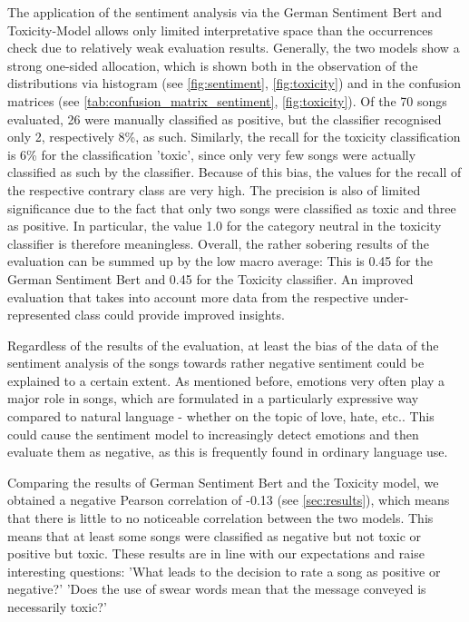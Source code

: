 The application of the sentiment analysis via the German Sentiment Bert and Toxicity-Model allows only limited interpretative space than the occurrences check due to relatively weak evaluation results. Generally, the two models show a strong one-sided allocation, which is shown both in the observation of the distributions via histogram (see \autoref{fig:sentiment}, \autoref{fig:toxicity}) and in the confusion matrices (see \autoref{tab:confusion_matrix_sentiment}, \autoref{fig:toxicity}). Of the 70 songs evaluated, 26 were manually classified as positive, but the classifier recognised only 2, respectively 8\%, as such. Similarly, the recall for the toxicity classification is 6\% for the classification 'toxic', since only very few songs were actually classified as such by the classifier. Because of this bias, the values for the recall of the respective contrary class are very high. The precision is also of limited significance due to the fact that only two songs were classified as toxic and three as positive. In particular, the value 1.0 for the category neutral in the toxicity classifier is therefore meaningless. Overall, the rather sobering results of the evaluation can be summed up by the low macro average: This is 0.45 for the German Sentiment Bert and 0.45 for the Toxicity classifier. An improved evaluation that takes into account more data from the respective under-represented class could provide improved insights.

Regardless of the results of the evaluation, at least the bias of the data of the sentiment analysis of the songs towards rather negative sentiment could be explained to a certain extent. As mentioned before, emotions very often play a major role in songs, which are formulated in a particularly expressive way compared to natural language - whether on the topic of love, hate, etc.. This could cause the sentiment model to increasingly detect emotions and then evaluate them as negative, as this is frequently found in ordinary language use.

Comparing the results of German Sentiment Bert and the Toxicity model, we obtained a negative Pearson correlation of -0.13 (see \autoref{sec:results}), which means that there is little to no noticeable correlation between the two models. This means that at least some songs were classified as negative but not toxic or positive but toxic. These results are in line with our expectations and raise interesting questions: 'What leads to the decision to rate a song as positive or negative?' 'Does the use of swear words mean that the message conveyed is necessarily toxic?' 

